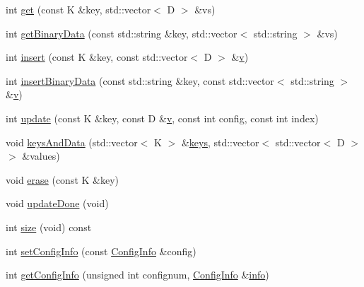 \begin{DoxyCompactItemize}
\item 
int \mbox{\hyperlink{classFILEDB_1_1AllConfStoreDB_a848466f7dce25cacc4e8560c50240d35}{get}} (const K \&key, std\+::vector$<$ D $>$ \&vs)
\item 
int \mbox{\hyperlink{classFILEDB_1_1AllConfStoreDB_aa923faf368f0aa7d327c2a3702d261c1}{get\+Binary\+Data}} (const std\+::string \&key, std\+::vector$<$ std\+::string $>$ \&vs)
\item 
int \mbox{\hyperlink{classFILEDB_1_1AllConfStoreDB_abf4a1ccd7306de436ba1ec61b242e02f}{insert}} (const K \&key, const std\+::vector$<$ D $>$ \&\mbox{\hyperlink{hadron__timeslice_8cc_a716fc87f5e814be3ceee2405ed6ff22a}{v}})
\item 
int \mbox{\hyperlink{classFILEDB_1_1AllConfStoreDB_ac2c898624d4b32c526951edfb6271d60}{insert\+Binary\+Data}} (const std\+::string \&key, const std\+::vector$<$ std\+::string $>$ \&\mbox{\hyperlink{hadron__timeslice_8cc_a716fc87f5e814be3ceee2405ed6ff22a}{v}})
\item 
int \mbox{\hyperlink{classFILEDB_1_1AllConfStoreDB_a3beaa117f0ddf32de13d5f96643b626c}{update}} (const K \&key, const D \&\mbox{\hyperlink{hadron__timeslice_8cc_a716fc87f5e814be3ceee2405ed6ff22a}{v}}, const int config, const int index)
\item 
void \mbox{\hyperlink{classFILEDB_1_1AllConfStoreDB_a9150983c712d6b870a75886f92b10a9d}{keys\+And\+Data}} (std\+::vector$<$ K $>$ \&\mbox{\hyperlink{classFILEDB_1_1ConfDataStoreDB_a794e05e3888ab95e0396a196b5a18e65}{keys}}, std\+::vector$<$ std\+::vector$<$ D $>$ $>$ \&values)
\item 
void \mbox{\hyperlink{classFILEDB_1_1AllConfStoreDB_afb092d33f9ca14ca30918d6cb8251fdb}{erase}} (const K \&key)
\item 
void \mbox{\hyperlink{classFILEDB_1_1AllConfStoreDB_ac90e596f6c914145130719ec5ac13593}{update\+Done}} (void)
\item 
int \mbox{\hyperlink{classFILEDB_1_1AllConfStoreDB_a78dd830c5211b3b00b8eae6170ffc9d6}{size}} (void) const
\item 
int \mbox{\hyperlink{classFILEDB_1_1AllConfStoreDB_a2062f555d190a3c52cc942447a090b8a}{set\+Config\+Info}} (const \mbox{\hyperlink{classFILEDB_1_1ConfigInfo}{Config\+Info}} \&config)
\item 
int \mbox{\hyperlink{classFILEDB_1_1AllConfStoreDB_a351639b9e19297abfa7b8b1aca013770}{get\+Config\+Info}} (unsigned int confignum, \mbox{\hyperlink{classFILEDB_1_1ConfigInfo}{Config\+Info}} \&\mbox{\hyperlink{structinfo}{info}})
\item 

\end{DoxyCompactItemize}
